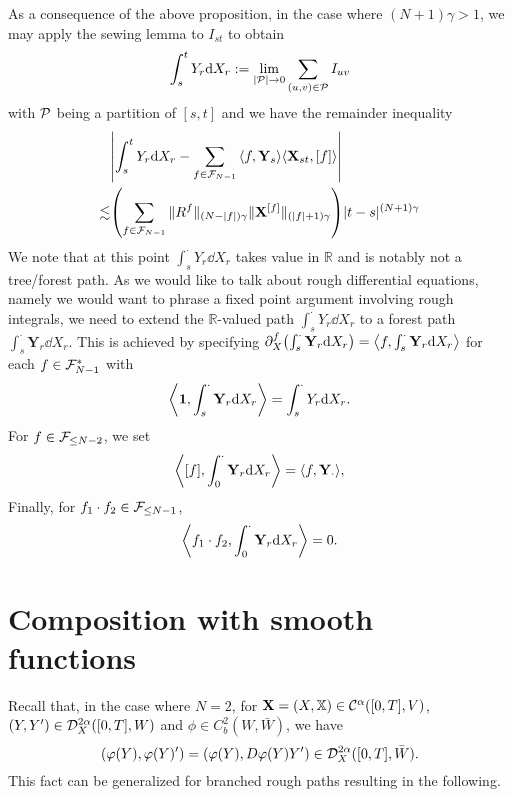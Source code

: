 \documentclass[a4paper, 10pt]{style/preprint}
\begin{document}
As a consequence of the above proposition, in the case where \((N + 1) \gamma > 1\), we may apply the sewing 
lemma to \(I_{st}\) to obtain 
\[\int_s^t Y_r \dd X_r := \lim_{|{\mathcal P}| \to 0} \sum_{(u, v) \in {\mathcal P}} I_{uv}\]
with \({\mathcal P}\) being a partition of \([s, t]\) and we have the remainder inequality 
\begin{align*}
  & \left|\int_s^t Y_r \dd X_r - \sum_{f \in \CF_{N - 1}} \< f, \mathbf{Y}_s\> \< \mathbf{X}_{st}, [f]\>\right|\\
  \lesssim & \left(\sum_{f \in \CF_{N - 1}} \|R^f\|_{(N - |f|)\gamma} \|\mathbf{X}^{[f]}\|_{(|f| + 1)\gamma}\right)|t - s|^{(N + 1)\gamma}
\end{align*}
We note that at this point \(\int_s^{\cdot} Y_r \dd X_r\) takes value in \(\mathbb{R}\) and is notably not a tree/forest 
path. As we would like to talk about rough differential equations, namely we would want to phrase a fixed point 
argument involving rough integrals, we need to extend the \(\mathbb{R}\)-valued path \(\int_s^{\cdot} Y_r \dd X_r\) 
to a forest path \(\int_s^{\cdot} \mathbf{Y}_r \dd X_r\). This is achieved by specifying 
\(\partial^f_X \left(\int_s^{\cdot} \mathbf{Y}_r \dd X_r\right) = \< f, \int_s^{\cdot} \mathbf{Y}_r \dd X_r \>\) 
for each \(f \in {\mathcal F}_{N - 1}^*\) with 
\[\< \mathbf{1}, \int_s^{\cdot} \mathbf{Y}_r \dd X_r \> = \int_s^{\cdot} Y_r \dd X_r.\]
For \(f \in {\mathcal F}_{\le N - 2}\), we set 
\[\< [f], \int_0^{\cdot} \mathbf{Y}_r \dd X_r \> = \< f, \mathbf{Y}_{\cdot}\>,\]
Finally, for \(f_1 \cdot f_2 \in {\mathcal F}_{\le N - 1}\),
\[\< f_1 \cdot f_2, \int_0^{\cdot} \mathbf{Y}_r \dd X_r \> = 0.\]

\section{Composition with smooth functions}

Recall that, in the case where \(N = 2\), for \(\mathbf{X} = (X, \mathbb{X}) \in {\mathcal C}^{\alpha}([0, T], V)\), 
\((Y, Y') \in {\mathcal D}_X^{2\alpha}([0, T], W)\) and \(\phi \in C^2_b(W, \bar W)\), we have 
\[(\varphi(Y), \varphi(Y)') = (\varphi(Y), D\varphi(Y) Y') \in {\mathcal D}_X^{2\alpha}([0, T], \bar W).\]
This fact can be generalized for branched rough paths resulting in the following.
\end{document}
